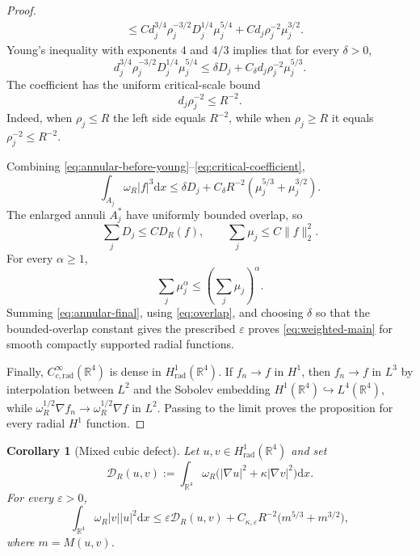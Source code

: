 \documentclass[10pt,a4paper]{amsart}
\numberwithin{equation}{section}
\newtheorem{corollary}[theorem]{Corollary}
\newcommand{\R}{\mathbb{R}}
\newcommand{\dd}{\mathrm{d}x}
\begin{document}
\begin{proof}
\begin{align}
 &\le C d_j^{3/4}\rho_j^{-3/2}D_j^{1/4}\mu_j^{5/4} +C d_j\rho_j^{-2}\mu_j^{3/2}.
 \label{eq:annular-before-young}
\end{align}
Young's inequality with exponents $4$ and $4/3$ implies that for every $\delta>0$,
\begin{equation}\label{eq:young-annulus}
 d_j^{3/4}\rho_j^{-3/2}D_j^{1/4}\mu_j^{5/4} \le \delta D_j+C_\delta d_j\rho_j^{-2}\mu_j^{5/3}.
\end{equation}
The coefficient has the uniform critical-scale bound
\begin{equation}\label{eq:critical-coefficient}
 d_j\rho_j^{-2}\le R^{-2}.
\end{equation}
Indeed, when $\rho_j\le R$ the left side equals $R^{-2}$, while when $\rho_j\ge R$ it equals $\rho_j^{-2}\le R^{-2}$.

Combining \eqref{eq:annular-before-young}--\eqref{eq:critical-coefficient},
\begin{equation}\label{eq:annular-final}
 \int_{A_j}\omega_R|f|^3\dd \le \delta D_j+C_\delta R^{-2} \left(\mu_j^{5/3}+\mu_j^{3/2}\right).
\end{equation}
The enlarged annuli $A_j^*$ have uniformly bounded overlap, so
\begin{equation}\label{eq:overlap}
 \sum_jD_j\le C D_R(f), \qquad \sum_j\mu_j\le C\|f\|_2^2.
\end{equation}
For every $\alpha\ge1$,
\[
 \sum_j\mu_j^\alpha\le\left(\sum_j\mu_j\right)^\alpha.
\]
Summing \eqref{eq:annular-final}, using \eqref{eq:overlap}, and choosing $\delta$ so that the bounded-overlap constant gives the prescribed $\varepsilon$ proves \eqref{eq:weighted-main} for smooth compactly supported radial functions.

Finally, $C_{c,\mathrm{rad}}^\infty(\R^4)$ is dense in $H^1_{\mathrm{rad}}(\R^4)$.  If $f_n\to f$ in $H^1$, then $f_n\to f$ in $L^3$ by interpolation between $L^2$ and the Sobolev embedding $H^1(\R^4)\hookrightarrow L^4(\R^4)$, while $\omega_R^{1/2}\nabla f_n\to\omega_R^{1/2}\nabla f$ in $L^2$.  Passing to the limit proves the proposition for every radial $H^1$ function.
\end{proof}

\begin{corollary}[Mixed cubic defect]\label{cor:mixed}
Let $u,v\in H^1_{\mathrm{rad}}(\R^4)$ and set
\begin{equation*}
 \mathcal D_R(u,v):=\int_{\R^4}\omega_R \big(|\nabla u|^2+\kappa|\nabla v|^2\big)\dd.
\end{equation*}
For every $\varepsilon>0$,
\begin{equation*}
 \int_{\R^4}\omega_R|v||u|^2\dd \le \varepsilon\mathcal D_R(u,v) +C_{\kappa,\varepsilon}R^{-2} \big(m^{5/3}+m^{3/2}\big),
\end{equation*}
where $m=M(u,v)$.
\end{corollary}
\end{document}
